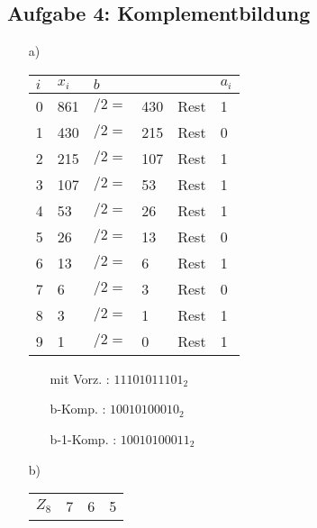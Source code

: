 \documentclass{article}
\begin{document}
    \subsection*{Aufgabe 4: Komplementbildung}
    \begin{enumerate}
        \item[a)] 
        \begin{minipage}[t]{0.5\textwidth}
            \begin{tabular}[t]{llllll}
                $i$ & $x_i$ & $b$       &       &       & $a_i$ \\
                \hline 
                0   & 861   & $/2 = $   & 430    & Rest  & 1 \\
                1   & 430   & $/2 = $   & 215    & Rest  & 0 \\
                2   & 215   & $/2 = $   & 107    & Rest  & 1 \\
                3   & 107   & $/2 = $   & 53     & Rest  & 1 \\
                4   & 53    & $/2 = $   & 26     & Rest  & 1 \\
                5   & 26    & $/2 = $   & 13     & Rest  & 0 \\
                6   & 13    & $/2 = $   & 6      & Rest  & 1 \\
                7   & 6     & $/2 = $   & 3      & Rest  & 0 \\
                8   & 3     & $/2 = $   & 1      & Rest  & 1 \\
                9   & 1     & $/2 = $   & 0      & Rest  & 1
            \end{tabular}
        \end{minipage}
        \begin{minipage}[t]{0.4\textwidth}
            \begin{enumerate}
                \item[mit Vorz.]: $11101011101_2$
                \item[b-Komp.]: $10010100010_2$
                \item[b-1-Komp.]: $10010100011_2$
            \end{enumerate}
        \end{minipage}
        \item[b)]
        \begin{minipage}[t]{0.5\textwidth}
            \begin{tabular}[t]{l|ccc}  
                $Z_{8}$ & 7   & 6   & 5   \\

\end{tabular}
\end{minipage}
\end{enumerate}
\end{document}
